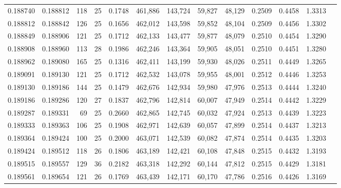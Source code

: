 \begin{tabular}{rrrrrrrrrrrrr}
0.188740 & 0.188812 & 118 &  25 &                                     0.1748 & 461,886 & 143,724 &  59,827 &  48,129 & 0.2509 & 0.4458 & 1.3313 \\
0.188812 & 0.188842 & 126 &  25 &                                     0.1656 & 462,012 & 143,598 &  59,852 &  48,104 & 0.2509 & 0.4456 & 1.3302 \\
0.188849 & 0.188906 & 121 &  25 &                                     0.1712 & 462,133 & 143,477 &  59,877 &  48,079 & 0.2510 & 0.4454 & 1.3290 \\
0.188908 & 0.188960 & 113 &  28 &                                     0.1986 & 462,246 & 143,364 &  59,905 &  48,051 & 0.2510 & 0.4451 & 1.3280 \\
0.188962 & 0.189080 & 165 &  25 &                                     0.1316 & 462,411 & 143,199 &  59,930 &  48,026 & 0.2511 & 0.4449 & 1.3265 \\
0.189091 & 0.189130 & 121 &  25 &                                     0.1712 & 462,532 & 143,078 &  59,955 &  48,001 & 0.2512 & 0.4446 & 1.3253 \\
0.189130 & 0.189186 & 144 &  25 &                                     0.1479 & 462,676 & 142,934 &  59,980 &  47,976 & 0.2513 & 0.4444 & 1.3240 \\
0.189186 & 0.189286 & 120 &  27 &                                     0.1837 & 462,796 & 142,814 &  60,007 &  47,949 & 0.2514 & 0.4442 & 1.3229 \\
0.189287 & 0.189331 &  69 &  25 &                                     0.2660 & 462,865 & 142,745 &  60,032 &  47,924 & 0.2513 & 0.4439 & 1.3223 \\
0.189333 & 0.189363 & 106 &  25 &                                     0.1908 & 462,971 & 142,639 &  60,057 &  47,899 & 0.2514 & 0.4437 & 1.3213 \\
0.189364 & 0.189424 & 100 &  25 &                                     0.2000 & 463,071 & 142,539 &  60,082 &  47,874 & 0.2514 & 0.4435 & 1.3203 \\
0.189424 & 0.189512 & 118 &  26 &                                     0.1806 & 463,189 & 142,421 &  60,108 &  47,848 & 0.2515 & 0.4432 & 1.3193 \\
0.189515 & 0.189557 & 129 &  36 &                                     0.2182 & 463,318 & 142,292 &  60,144 &  47,812 & 0.2515 & 0.4429 & 1.3181 \\
0.189561 & 0.189654 & 121 &  26 &                                     0.1769 & 463,439 & 142,171 &  60,170 &  47,786 & 0.2516 & 0.4426 & 1.3169 \\

\end{tabular}
